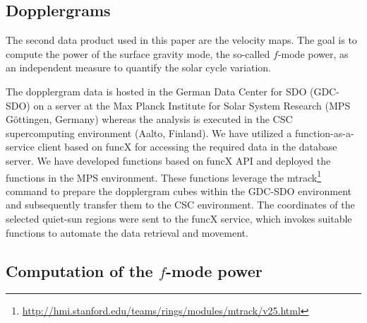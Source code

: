 \documentclass{aa}
\begin{document}
\subsection{Dopplergrams}

The second data product used in this paper are the \los{} velocity maps. The goal is to compute the power of the surface gravity mode, the so-called $f$-mode power, as an independent measure to quantify the solar cycle variation.

The dopplergram data is hosted in the German Data Center for SDO (GDC-SDO) on a server at the Max Planck Institute for Solar System Research (MPS Göttingen, Germany) whereas the analysis is executed in the CSC supercomputing environment (Aalto, Finland). We have utilized  a function-as-a-service client based on funcX \cite[]{chard20funcx} for accessing the required data in the database server. We have developed functions based on funcX API and deployed the functions in the MPS environment. These functions leverage the mtrack\footnote{\url{http://hmi.stanford.edu/teams/rings/modules/mtrack/v25.html}} command to prepare the dopplergram cubes within the GDC-SDO environment and subsequently transfer them to the CSC environment. The coordinates of the selected quiet-sun regions were sent to the funcX service, which invokes suitable functions to automate the data retrieval and movement.


\subsection{Computation of the $f$-mode power}
\end{document}
